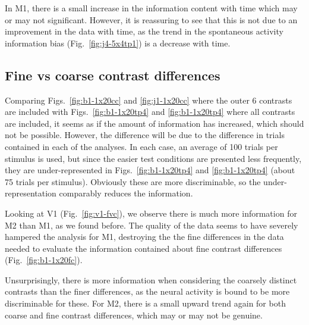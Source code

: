 In M1, there is a small increase in the information content with time which may or may not significant. However, it is reassuring to see that this is not due to an improvement in the data with time, as the trend in the spontaneous activity information bias (Fig.~\ref{fig:j4-5x4tp1}) is a decrease with time.

\FloatBarrier
\subsection{Fine vs coarse contrast differences}

Comparing Figs.~\ref{fig:b1-1x20cc} and \ref{fig:j1-1x20cc} where the outer 6 contrasts are included with Figs.~\ref{fig:b1-1x20tp4} and \ref{fig:b1-1x20tp4} where all contrasts are included, it seems as if the amount of information has increased, which should not be possible. However, the difference will be due to the difference in trials contained in each of the analyses. In each case, an average of 100 trials per stimulus is used, but since the easier test conditions are presented less frequently, they are under-represented in Figs.~\ref{fig:b1-1x20tp4} and \ref{fig:b1-1x20tp4} (about 75 trials per stimulus). Obviously these are more discriminable, so the under-representation comparably reduces the information.

Looking at V1 (Fig.~\ref{fig:v1-fvc}), we observe there is much more information for M2 than M1, as we found before. The quality of the data seems to have severely hampered the analysis for M1, destroying the the fine differences in the data needed to evaluate the information contained about fine contrast differences (Fig.~\ref{fig:b1-1x20fc}).

Unsurprisingly, there is more information when considering the coarsely distinct contrasts than the finer differences, as the neural activity is bound to be more discriminable for these. For M2, there is a small upward trend again for both coarse and fine contrast differences, which may or may not be genuine.


